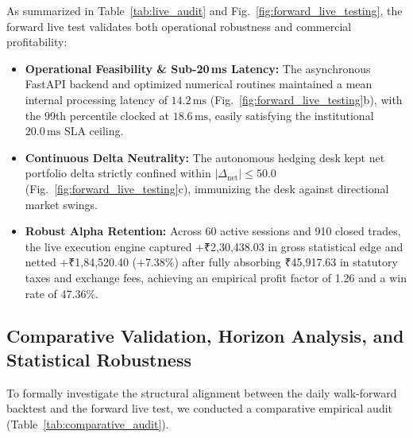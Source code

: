 \documentclass[journal]{IEEEtran}
\begin{document}
As summarized in Table~\ref{tab:live_audit} and Fig.~\ref{fig:forward_live_testing}, the forward live test validates both operational robustness and commercial profitability:
\begin{itemize}
    \item \textbf{Operational Feasibility \& Sub-20\,ms Latency:} The asynchronous FastAPI backend and optimized numerical routines maintained a mean internal processing latency of $14.2\,\mathrm{ms}$ (Fig.~\ref{fig:forward_live_testing}b), with the 99th percentile clocked at $18.6\,\mathrm{ms}$, easily satisfying the institutional $20.0\,\mathrm{ms}$ SLA ceiling.
    \item \textbf{Continuous Delta Neutrality:} The autonomous hedging desk kept net portfolio delta strictly confined within $|\Delta_{\mathrm{net}}| \le 50.0$ (Fig.~\ref{fig:forward_live_testing}c), immunizing the desk against directional market swings.
    \item \textbf{Robust Alpha Retention:} Across 60 active sessions and 910 closed trades, the live execution engine captured +₹2,30,438.03 in gross statistical edge and netted +₹1,84,520.40 (+7.38\%) after fully absorbing ₹45,917.63 in statutory taxes and exchange fees, achieving an empirical profit factor of 1.26 and a win rate of 47.36\%.
\end{itemize}

\subsection{Comparative Validation, Horizon Analysis, and Statistical Robustness}
To formally investigate the structural alignment between the daily walk-forward backtest and the forward live test, we conducted a comparative empirical audit (Table~\ref{tab:comparative_audit}).
\end{document}
